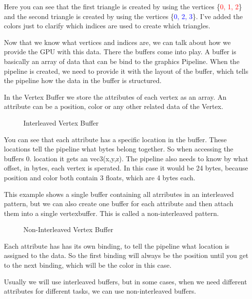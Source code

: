 \documentclass[12pt]{report} \usepackage {preamble}
\begin{document}
Here you can see that the first triangle is created by using the vertices
\{\textcolor{red}{0, 1, 2}\} and the second triangle is created by using
the vertices \{\textcolor{blue}{0, 2, 3}\}. I've added the colors just
to clarify which indices are used to create which triangles.

Now that we know what vertices and indices are, we can talk about how we
provide the GPU with this data. There the buffers come into play. A buffer
is basically an array of data that can be bind to the graphics Pipeline.
When the pipeline is created, we need to provide it with the layout of the
buffer, which tells the pipeline how the data in the buffer is structured.
\cite{vulkan-tutorial-vertex-buffer}

In the Vertex Buffer we store the attributes of each vertex as an
array. An attribute can be a position, color or any other related data
of the Vertex. \cite{vulkan-tutorial-vertex-buffer}

\begin{figure}[hbtp]
	\centering 
	\caption{Interleaved Vertex Buffer}
\end{figure} \FloatBarrier

You can see that each attribute has a specific location in the buffer.
These locations tell the pipeline what bytes belong together. So when
accessing the buffers 0. location it gets an vec3(x,y,z).  The pipeline
also needs to know by what offset, in bytes, each vertex is sperated.
In this case it would be 24 bytes, because position and color both
contain 3 floats, which are 4 bytes each. \cite{vulkan-tutorial-vertex-buffer}

This example shows a single buffer containing all atrributes in
an interleaved pattern, but we can also create one buffer for each
attribute and then attach them into a single vertexbuffer. This is called
a non-interleaved pattern.

\begin{figure}[hbtp]
	
	\caption{Non-Interleaved Vertex Buffer}
\end{figure} \FloatBarrier

Each attribute has has its own binding, to tell the pipeline what location
is assigned to the data. So the first binding will always be the position
until you get to the next binding, which will be the color in this case.
\cite{vulkan-tutorial-vertex-buffer}

Usually we will use interleaved buffers, but in some cases, when we need
different attributes for different tasks, we can use non-interleaved
buffers.
\end{document}
